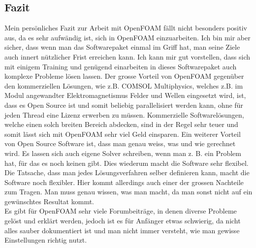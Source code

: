 \begin{refsection}
\section{Fazit}
Mein persönliches Fazit zur Arbeit mit OpenFOAM fällt nicht besonders positiv aus, da es sehr aufwändig ist, sich in OpenFOAM einzuarbeiten. Ich bin mir aber sicher, dass wenn man das Softwarepaket einmal im Griff hat, man seine Ziele auch innert nützlicher Frist erreichen kann. Ich kann mir gut vorstellen, dass sich mit einigem Training und genügend einarbeiten in dieses Softwarepaket auch komplexe Probleme lösen lassen. Der grosse Vorteil von OpenFOAM gegenüber den kommerziellen Lösungen, wie z.B. COMSOL Multiphysics, welches z.B. im Modul angewandter Elektromagnetismus Felder und Wellen eingesetzt wird, ist, dass es Open Source ist und somit beliebig parallelisiert werden kann, ohne für jeden Thread eine Lizenz erwerben zu müssen. Kommerzielle Softwarelösungen, welche einen solch breiten Bereich abdecken, sind in der Regel sehr teuer und somit lässt sich mit OpenFOAM sehr viel Geld einsparen. Ein weiterer Vorteil von Open Source Software ist, dass man genau weiss, was und wie gerechnet wird. Es lassen sich auch eigene Solver schreiben, wenn man z. B. ein Problem hat, für das es noch keinen gibt. Dies wiederum macht die Software sehr flexibel. Die Tatsache, dass man jedes Lösungsverfahren selber definieren kann, macht die Software noch flexibler. Hier kommt allerdings auch einer der grossen Nachteile zum Tragen. Man muss genau wissen, was man macht, da man sonst nicht auf ein gewünschtes Resultat kommt. \\
Es gibt für OpenFOAM sehr viele Forumbeiträge, in denen diverse Probleme gelöst und erklärt werden, jedoch ist es für Anfänger etwas schwierig, da nicht alles sauber dokumentiert ist und man nicht immer versteht, wie man gewisse Einstellungen richtig nutzt. 
\printbibliography[heading=subbibliography]
\end{refsection}